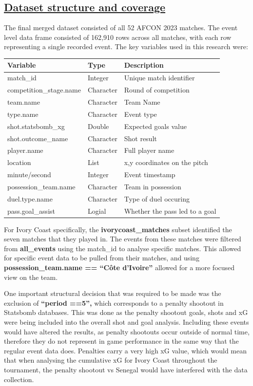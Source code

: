 \documentclass[
  11pt,
  letterpaper,
  DIV=11,
  numbers=noendperiod]{scrartcl}
\begin{document}
\subsection{\texorpdfstring{\ul{Dataset structure and
coverage}}{Dataset structure and coverage}}\label{dataset-structure-and-coverage}

The final merged dataset consisted of all 52 AFCON 2023 matches. The
event level data frame consisted of 162,910 rows across all matches,
with each row representing a single recorded event. The key variables
used in this research were:

\begin{longtable}[]{@{}lll@{}}
\toprule\noalign{}
Variable & Type & Description \\
\midrule\noalign{}
\endhead
\bottomrule\noalign{}
\endlastfoot
match\_id & Integer & Unique match identifier \\
competition\_stage.name & Character & Round of competition \\
team.name & Character & Team Name \\
type.name & Character & Event type \\
shot.statsbomb\_xg & Double & Expected goals value \\
shot.outcome\_name & Character & Shot result \\
player.name & Character & Full player name \\
location & List & x,y coordinates on the pitch \\
minute/second & Integer & Event timestamp \\
possession\_team.name & Character & Team in possession \\
duel.type.name & Character & Type of duel occuring \\
pass.goal\_assist & Logial & Whether the pass led to a goal \\
\end{longtable}

For Ivory Coast specifically, the \textbf{ivorycoast\_matches} subset
identified the seven matches that they played in. The events from these
matches were filtered from \textbf{all\_events} using the match\_id to
analyse specific matches. This allowed for specific event data to be
pulled from their matches, and using \textbf{possession\_team.name ==
``Côte d'Ivoire''} allowed for a more focused view on the team.

One important structural decision that was required to be made was the
exclusion of \textbf{``period ==5'',} which corresponds to a penalty
shootout in Statsbomb databases. This was done as the penalty shootout
goals, shots and xG were being included into the overall shot and goal
analysis. Including these events would have altered the results, as
penalty shootouts occur outside of normal time, therefore they do not
represent in game performance in the same way that the regular event
data does. Penalties carry a very high xG value, which would mean that
when analysing the cumulative xG for Ivory Coast throughout the
tournament, the penalty shootout vs Senegal would have interfered with
the data collection.
\end{document}
